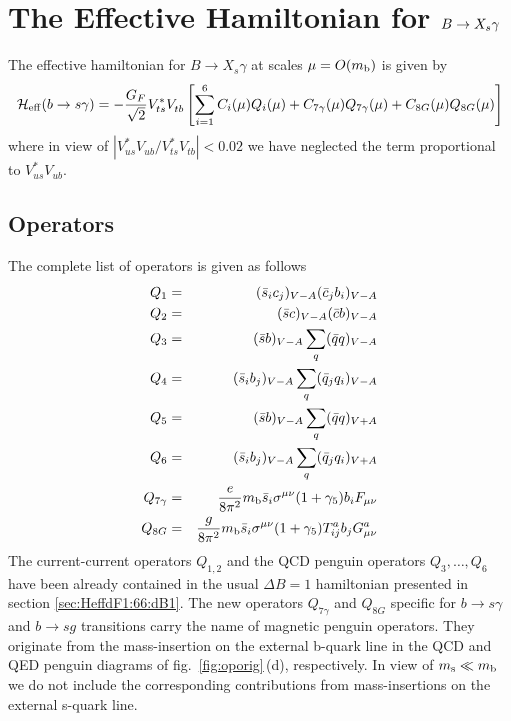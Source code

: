 \section{The Effective Hamiltonian for $B\to X_{\lowercase{s}}\gamma$} 
         \label{sec:Heff:BXsgamma}
The effective hamiltonian for $B\to X_s\gamma$ at scales $\mu=O(m_{\rm b})$
is given by
\begin{equation}
{\cal H}_{\rm eff}(b\to s\gamma) = - \frac{G_F}{\sqrt{2}} V_{ts}^* V^{}_{tb}
\left[ \sum_{i=1}^6 C_i(\mu) Q_i(\mu) + C_{7\gamma}(\mu) Q_{7\gamma}(\mu)
+C_{8G}(\mu) Q_{8G}(\mu) \right]
\label{eq:HeffBXsgamma}
\end{equation}
where in view of $|V_{us}^*V_{ub}^{} / V_{ts}^* V_{tb}^{}| < 0.02$
we have neglected the term proportional to $V_{us}^*V_{ub}^{}$.

\subsection{Operators}
         \label{sec:Heff:BXsgamma:ops}
The complete list of operators is given as follows
\begin{eqnarray}
Q_1    & = & (\bar{s}_{i}  c_{j})_{V-A}
           (\bar{c}_{j}  b_{i})_{V-A}        \nonumber \\
Q_2    & = & (\bar{s} c)_{V-A}  (\bar{c} b)_{V-A}      \nonumber \\
Q_3    & = & (\bar{s} b)_{V-A}\sum_q(\bar{q}q)_{V-A}   \nonumber \\
Q_4    & = & (\bar{s}_{i}  b_{j})_{V-A} \sum_q (\bar{q}_{j}
          q_{i})_{V-A}     \nonumber \\
Q_5    & = & (\bar{s} b)_{V-A}\sum_q(\bar{q}q)_{V+A}
             \label{eq:BXsgamma:ops} \\
Q_6    & = & (\bar{s}_{i}  b_{j})_{V-A}
   \sum_q  (\bar{q}_{j}  q_{i})_{V+A}        \nonumber \\
Q_{7\gamma}    & = & \frac{e}{8\pi^2} m_{\rm b} \bar{s}_i \sigma^{\mu\nu}
          (1+\gamma_5) b_i F_{\mu\nu}             \nonumber \\
Q_{8G}    & = & \frac{g}{8\pi^2} m_{\rm b} \bar{s}_i \sigma^{\mu\nu}
   (1+\gamma_5)T^a_{ij} b_j G^a_{\mu\nu}  \nonumber
\end{eqnarray}
The current-current operators $Q_{1,2}$ and the QCD penguin operators
$Q_3,\ldots,Q_6$ have been already contained in the usual $\Delta B=1$
hamiltonian presented in section \ref{sec:HeffdF1:66:dB1}. The new
operators $Q_{7\gamma}$ and $Q_{8G}$ specific for $b\to s\gamma$ and
$b\to s g$ transitions carry the name of magnetic penguin operators.
They originate from the mass-insertion on the external b-quark line in
the QCD and QED penguin diagrams of fig.\ \ref{fig:oporig}\,(d),
respectively. In view of $m_{\rm s} \ll m_{\rm b}$ we do not include the corresponding
contributions from mass-insertions on the external s-quark line.

